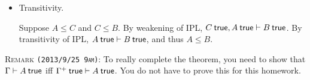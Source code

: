 \documentclass[12pt]{article}
\newcommand{\cut}[1]{}
\newcommand{\showsol}[1]{\color{FireBrick}#1\normalcolor}%
\newcommand{\showsol}[1]{\cut{#1}}%
\newenvironment{sol}{\trivlist \item[\hskip \labelsep{\bf
Solution:}]}{\endtrivlist}
\newcommand{\showextra}[1]{\color{DarkOliveGreen}#1\normalcolor}
\begin{document}
\showsol{
  \begin{sol}\mbox{}
    \begin{itemize}
      \item Transitivity.

        Suppose $A \leq C$ and $C \leq B$.
        By weakening of IPL, $C \true, A \true \entails B \true$.
        By transitivity of IPL, $A \true \entails B \true$, and thus $A \leq B$.
    \end{itemize}
  \end{sol}
}

\showextra{
  \begin{mdframed}[style=extra]
    \textsc{Remark \texttt{(2013/9/25 9am)}:}
    To really complete the theorem, you need to show that $\Gamma \entails A \true$
    iff $\Gamma^+ \true \entails A \true$. You do not have to prove this
    for this homework.
  \end{mdframed}
}
\end{document}
